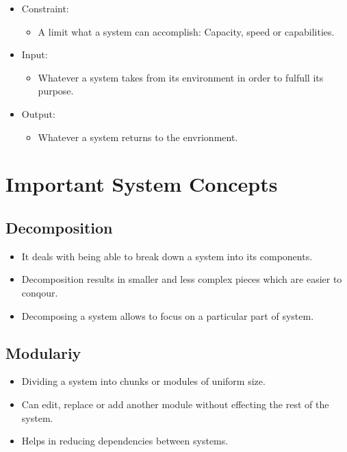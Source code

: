 \begin{itemize}
    \item Constraint:
        \begin{itemize}
            \item A limit what a system can accomplish:
                Capacity, speed or capabilities.
        \end{itemize}

    \item Input: 
        \begin{itemize}
            \item Whatever a system takes from its environment in order
                to fulfull its purpose.
        \end{itemize}

    \item Output:
        \begin{itemize}
            \item Whatever a system returns to the envrionment.
        \end{itemize}
\end{itemize}

\section{Important System Concepts}

\subsection{Decomposition}

\begin{itemize}
    \item It deals with being able to break down a system into
        its components.
    \item Decomposition results in smaller and less complex pieces
        which are easier to conqour.
    \item Decomposing a system allows to focus on a particular 
        part of system.
\end{itemize}

\subsection{Modulariy}

\begin{itemize}
    \item Dividing a system into chunks or modules of uniform size.
    \item Can edit, replace or add another module without
        effecting the rest of the system.
    \item Helps in reducing dependencies between systems.
\end{itemize}

